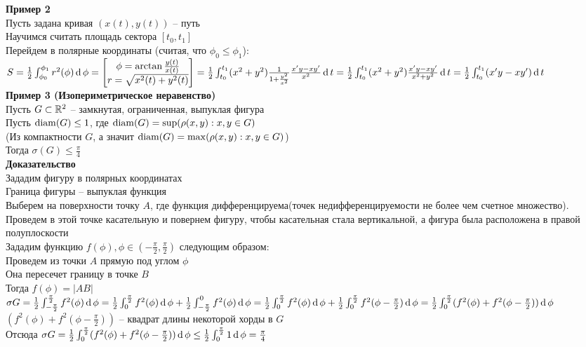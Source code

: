 \documentclass[12pt]{article}
\begin{document}
\textbf{Пример 2}\\
Пусть задана кривая $(x(t), y(t))$ -- путь\\
Научимся считать площадь сектора $[t_0, t_1]$\\
Перейдем в полярные координаты (считая, что $\phi_0 \leq \phi_1$):\\
$S = \frac12 \int_{\phi_0}^{\phi_1} r^2(\phi)\operatorname{d} \phi = \begin{bmatrix}
    \phi = \arctan \frac{y(t)}{x(t)}\\
    r = \sqrt{x^2(t)+y^2(t)}
\end{bmatrix} = \frac12 \int_{t_0}^{t_1} (x^2+y^2)\frac1{1 + \frac{y^2}{x^2}} \frac{x'y-xy'}{x^2} \operatorname{d} t = \frac12 \int_{t_0}^{t_1} (x^2+y^2)\frac{x'y-xy'}{x^2+y^2}\operatorname{d} t = \frac12\int_{t_0}^{t_1}(x'y-xy')\operatorname{d} t$\\
\textbf{Пример 3 (Изопериметрическое неравенство)}\\
Пусть $G \subset \mathbb{R}^2$ -- замкнутая, ограниченная, выпуклая фигура\\
Пусть $\operatorname{diam}(G) \leq 1$, где $\operatorname{diam}(G) = \sup (\rho(x,y): x,y \in G)$\\
(Из компактности $G$, а значит $\operatorname{diam}(G) = \max (\rho(x,y): x,y \in G)$)\\
Тогда $\sigma(G) \leq \frac\pi4$\\
\textbf{Доказательство}\\
Зададим фигуру в полярных координатах\\
Граница фигуры -- выпуклая функция\\
Выберем на поверхности точку $A$, где функция дифференцируема(точек недифференцируемости не более чем счетное множество). Проведем в этой точке касательную и повернем фигуру, чтобы касательная стала вертикальной, а фигура была расположена в правой полуплоскости\\
Зададим функцию $f(\phi), \phi \in (-\frac\pi2, \frac\pi2)$ следующим образом:\\
Проведем из точки $A$ прямую под углом $\phi$\\
Она пересечет границу в точке $B$\\
Тогда $f(\phi) = |AB|$\\
$\sigma G = \frac12 \int_{-\frac\pi2}^{\frac\pi2} f^2(\phi)\operatorname{d} \phi = \frac12 \int_0^{\frac\pi2} f^2(\phi)\operatorname{d} \phi + \frac12 \int_{-\frac\pi2}^0 f^2(\phi)\operatorname{d} \phi = \frac12 \int_0^{\frac\pi2} f^2(\phi)\operatorname{d} \phi + \frac12 \int_0^{\frac\pi2} f^2(\phi-\frac\pi2)\operatorname{d} \phi = \frac12 \int_0^{\frac\pi2} (f^2(\phi)+f^2(\phi-\frac\pi2)) \operatorname{d} \phi$\\
$(f^2(\phi)+f^2(\phi-\frac\pi2))$ -- квадрат длины некоторой хорды в $G$\\
Отсюда $\sigma G = \frac12 \int_0^{\frac\pi2} (f^2(\phi)+f^2(\phi-\frac\pi2)) \operatorname{d} \phi \leq \frac12 \int_0^{\frac\pi2} 1 \operatorname{d} \phi = \frac\pi4$
\end{document}
